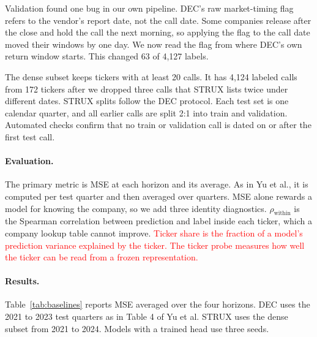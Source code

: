 \documentclass{article}
\newcommand{\new}[1]{\textcolor{red}{#1}}
\begin{document}
Validation found one bug in our own pipeline. DEC's raw market-timing flag refers to the vendor's report date, not the call date. Some companies release after the close and hold the call the next morning, so applying the flag to the call date moved their windows by one day. We now read the flag from where DEC's own return window starts. This changed 63 of 4,127 labels.

The dense subset keeps tickers with at least 20 calls. It has 4,124 labeled calls from 172 tickers after we dropped three calls that STRUX lists twice under different dates. STRUX splits follow the DEC protocol. Each test set is one calendar quarter, and all earlier calls are split 2:1 into train and validation. Automated checks confirm that no train or validation call is dated on or after the first test call.

\paragraph{Evaluation.}
The primary metric is MSE at each horizon and its average. As in Yu et al., it is computed per test quarter and then averaged over quarters. MSE alone rewards a model for knowing the company, so we add three identity diagnostics. $\rho_{\text{within}}$ is the Spearman correlation between prediction and label inside each ticker, which a company lookup table cannot improve. \new{Ticker share is the fraction of a model's prediction variance explained by the ticker. The ticker probe measures how well the ticker can be read from a frozen representation.}

\paragraph{Results.}
Table~\ref{tab:baselines} reports MSE averaged over the four horizons. DEC uses the 2021 to 2023 test quarters as in Table 4 of Yu et al. STRUX uses the dense subset from 2021 to 2024. Models with a trained head use three seeds.
\end{document}
